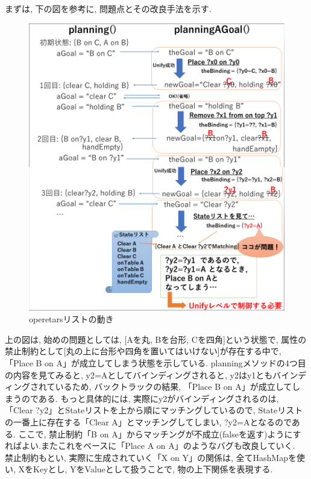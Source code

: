 \documentclass[uplatex,12pt]{jsarticle}
\begin{document}
まずは, 下の図を参考に, 問題点とその改良手法を示す.
\begin{figure}[htbp]
 \begin{center}
   \includegraphics[width = 12cm, pagebox = cropbox, clip]{images/ishiduya.png}
 \end{center}
 \caption[]{operetarsリストの動き}\label{fig:fig1.1}
\end{figure}
上の図は, 始めの問題としては, [Aを丸, Bを台形, Cを四角]という状態で, 属性の禁止制約として[丸の上に台形や四角を置いてはいけない]が存在する中で, 「Place B on A」が成立してしまう状態を示している. planningメソッドの4つ目の内容を見てみると, y2=Aとしてバインディングされると, y2はy1ともバインディングされているため, バックトラックの結果, 「Place B on A」が成立してしまうのである. もっと具体的には, 実際にy2がバインディングされるのは, 「Clear ?y2」とStateリストを上から順にマッチングしているので, Stateリストの一番上に存在する「Clear A」とマッチングしてしまい, ?y2=Aとなるのである. ここで, 禁止制約「B on A」からマッチングが不成立(falseを返す)ようにすればよい.またこれをベースに「Place A on A」のようなバグも改良していく.\\

禁止制約もとい, 実際に生成されていく「X on Y」の関係は, 全てHashMapを使い, XをKeyとし, YをValueとして扱うことで, 物の上下関係を表現する.\\
\end{document}
